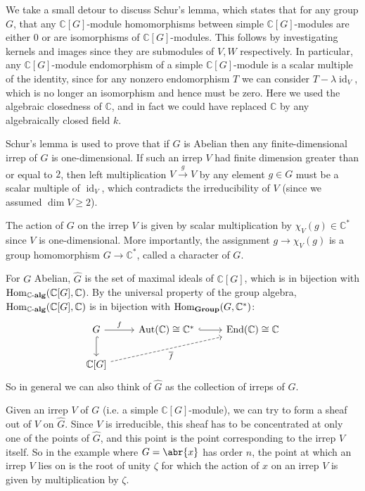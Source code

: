 \documentclass[11pt,leqno]{article}
\theoremstyle{plain}
\theoremstyle{definition}
\numberwithin{equation}{section}
\numberwithin{lem}{section}
\DeclareMathOperator{\Hom}{Hom}
\DeclareMathOperator{\id}{id}
\DeclareMathOperator{\Aut}{Aut}
\DeclareMathOperator{\End}{End}
\newcommand{\catname}[1]{{\normalfont\mathbf{#1}}}
\newcommand{\alg}{\text{-}\catname{alg}}
\newcommand{\Group}{\catname{Group}}
\begin{document}
We take a small detour to discuss Schur's lemma, which states that for any group $G$, that any $\mathbb C[G]$-module homomorphisms between simple $\mathbb C[G]$-modules are either $0$ or are isomorphisms of $\mathbb C[G]$-modules. This follows by investigating kernels and images since they are submodules of $V,W$ respectively. In particular, any $\mathbb C[G]$-module endomorphism of a simple $\mathbb C[G]$-module is a scalar multiple of the identity, since for any nonzero endomorphism $T$ we can consider $T-\lambda \id_V$, which is no longer an isomorphism and hence must be zero. Here we used the algebraic closedness of $\mathbb C$, and in fact we could have replaced $\mathbb C$ by any algebraically closed field $k$.

Schur's lemma is used to prove that if $G$ is Abelian then any finite-dimensional irrep of $G$ is one-dimensional. If such an irrep $V$ had finite dimension greater than or equal to $2$, then left multiplication $V\xrightarrow{g}V$ by any element $g\in G$ must be a scalar multiple of $\id_V$, which contradicts the irreducibility of $V$ (since we assumed $\dim V\geq 2$). 

The action of $G$ on the irrep $V$ is given by scalar multiplication by $\chi_V(g)\in \mathbb C^\ast$ since $V$ is one-dimensional. More importantly, the assignment $g\to\chi_V(g)$ is a group homomorphism $G\to \mathbb C^\ast$, called a character of $G$.

For $G$ Abelian, $\widehat G$ is the set of maximal ideals of $\mathbb C[G]$, which is in bijection with $\Hom_{\mathbb C\alg}(\mathbb C[G],\mathbb C)$. By the universal property of the group algebra, $\Hom_{\mathbb C\alg}(\mathbb C[G],\mathbb C)$ is in bijection with $ \Hom_{\Group}(G,\mathbb C^\ast)$:
\[\begin{tikzcd}[ampersand replacement=\&]
	G \& {\Aut(\mathbb C)\cong \mathbb C^\ast} \& {\End(\mathbb C)\cong \mathbb C} \\
	{\mathbb C[G]}
	\arrow["f", from=1-1, to=1-2]
	\arrow[hook, from=1-1, to=2-1]
	\arrow[hook, from=1-2, to=1-3]
	\arrow["{\overline f}"', dashed, from=2-1, to=1-3]
\end{tikzcd}\]
So in general we can also think of $\widehat G$ as the collection of irreps of $G$.

Given an irrep $V$ of $G$ (i.e. a simple $\mathbb C[G]$-module), we can try to form a sheaf out of $V$ on $\widehat G$. Since $V$ is irreducible, this sheaf has to be concentrated at only one of the points of $\widehat{G}$, and this point is the point corresponding to the irrep $V$ itself. So in the example where $G = \abr{x}$ has order $n$, the point at which an irrep $V$ lies on is the root of unity $\zeta$ for which the action of $x$ on an irrep $V$ is given by multiplication by $\zeta$.
\end{document}
